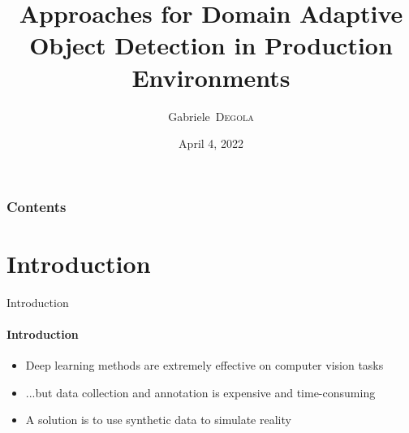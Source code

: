 \documentclass[aspectratio=141]{beamer}
\title[Approaches for Domain Adaptive Object Detection in Production Environments]{Approaches for Domain Adaptive Object Detection in Production Environments}
\date[04/04/2022]{April 4, 2022}
\author[G. Degola]{Gabriele~\textsc{Degola}}
\newcommand\pro{\item[\faThumbsOUp]}
\newcommand\con{\item[\faThumbsODown]}
\begin{document}
\begin{frame}
\titlepage
\end{frame}

\begin{frame}
    \frametitle{Contents}
    \tableofcontents
\end{frame}

\section{Introduction}

\begin{frame}{Introduction}
    \framesubtitle{Introduction}
    
    \begin{overlayarea}{\textwidth}{6cm}
    \begin{itemize}
        \pro<1-> \alert{Deep learning} methods are extremely effective on \alert{computer vision} tasks
        \con<2-> ...but data collection and annotation is expensive and time-consuming
        \vspace*{3mm}
        \pro<3-> A solution is to use \alert{synthetic} data to simulate \alert{reality}

\end{itemize}
\end{overlayarea}
\end{frame}
\end{document}
